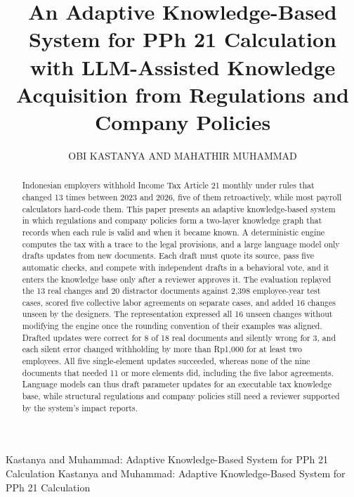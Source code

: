 \documentclass{ieeeaccess}
\begin{document}

\title{An Adaptive Knowledge-Based System for PPh 21 Calculation with LLM-Assisted Knowledge Acquisition from Regulations and Company Policies}

\author{\uppercase{Obi Kastanya}
AND \uppercase{Mahathir Muhammad}}

\address[1]{Department of Informatics, Institut Teknologi Sepuluh Nopember, Surabaya 60111, Indonesia
(e-mail: 6025252015@student.its.ac.id; 6025252008@student.its.ac.id)}

\markboth
{Kastanya and Muhammad: Adaptive Knowledge-Based System for PPh 21 Calculation}
{Kastanya and Muhammad: Adaptive Knowledge-Based System for PPh 21 Calculation}


\begin{abstract}
Indonesian employers withhold Income Tax Article 21 monthly under rules that changed 13 times between 2023 and 2026, five of them retroactively, while most payroll calculators hard-code them. This paper presents an adaptive knowledge-based system in which regulations and company policies form a two-layer knowledge graph that records when each rule is valid and when it became known. A deterministic engine computes the tax with a trace to the legal provisions, and a large language model only drafts updates from new documents. Each draft must quote its source, pass five automatic checks, and compete with independent drafts in a behavioral vote, and it enters the knowledge base only after a reviewer approves it. The evaluation replayed the 13 real changes and 20 distractor documents against 2,398 employee-year test cases, scored five collective labor agreements on separate cases, and added 16 changes unseen by the designers. The representation expressed all 16 unseen changes without modifying the engine once the rounding convention of their examples was aligned. Drafted updates were correct for 8 of 18 real documents and silently wrong for 3, and each silent error changed withholding by more than Rp1,000 for at least two employees. All five single-element updates succeeded, whereas none of the nine documents that needed 11 or more elements did, including the five labor agreements. Language models can thus draft parameter updates for an executable tax knowledge base, while structural regulations and company policies still need a reviewer supported by the system's impact reports.
\end{abstract}
\end{document}
